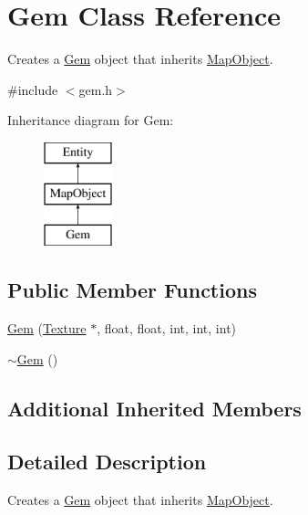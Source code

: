 \hypertarget{class_gem}{\section{Gem Class Reference}
\label{class_gem}
}


Creates a \hyperlink{class_gem}{Gem} object that inherits \hyperlink{class_map_object}{Map\+Object}.  




{\ttfamily \#include $<$gem.\+h$>$}

Inheritance diagram for Gem\+:\begin{figure}[H]
\begin{center}
\leavevmode
\includegraphics[height=3.000000cm]{class_gem}
\end{center}
\end{figure}
\subsection*{Public Member Functions}
\begin{DoxyCompactItemize}
\item 
\hyperlink{class_gem_ab8ba47cbb47eb57fb71b2f351df920af}{Gem} (\hyperlink{class_texture}{Texture} $\ast$, float, float, int, int, int)
\item 
\hyperlink{class_gem_a25c24193733a5c4b9c230e4164b08cd4}{$\sim$\+Gem} ()
\end{DoxyCompactItemize}
\subsection*{Additional Inherited Members}


\subsection{Detailed Description}
Creates a \hyperlink{class_gem}{Gem} object that inherits \hyperlink{class_map_object}{Map\+Object}. 

